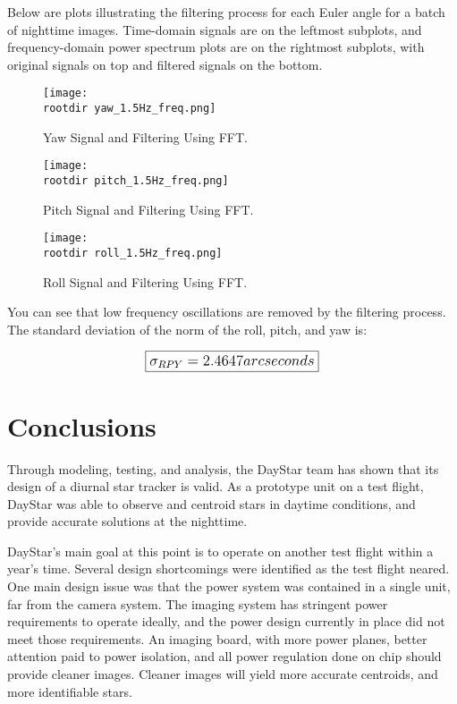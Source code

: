 \documentclass[twocolumn,letterpaper]{IEEEAerospace2012}
\newcommand{\rootdir}{./Figures/}
\begin{document}
Below are plots illustrating the filtering process for each Euler angle for a batch of nighttime images. Time-domain signals are on the leftmost subplots, and frequency-domain power spectrum plots are on the rightmost subplots, with original signals on top and filtered signals on the bottom.

\begin{figure}
    \texttt{[image: \\rootdir yaw\_1.5Hz\_freq.png]}
    \caption{Yaw Signal and Filtering Using FFT.}
    \label{fig:Yaw Filtering}
\end{figure}

\begin{figure}
    \texttt{[image: \\rootdir pitch\_1.5Hz\_freq.png]}
    \caption{Pitch Signal and Filtering Using FFT.}
    \label{fig:Pitch Filtering}
\end{figure}

\begin{figure}
    \texttt{[image: \\rootdir roll\_1.5Hz\_freq.png]}
    \caption{Roll Signal and Filtering Using FFT.}
    \label{fig:Roll Filtering}
\end{figure}

You can see that low frequency oscillations are removed by the filtering process. The standard deviation of the norm of the roll, pitch, and yaw is:

\begin{displaymath}\large
    \boxed{\sigma_{RPY} = 2.4647 arcseconds}
\end{displaymath}

\section{Conclusions}
Through modeling, testing, and analysis, the DayStar team has shown that its design of a diurnal star tracker is valid. As a prototype unit on a test flight, DayStar was able to observe and centroid stars in daytime conditions, and provide accurate solutions at the nighttime.

DayStar's main goal at this point is to operate on another test flight within a year's time. Several design shortcomings were identified as the test flight neared. One main design issue was that the power system was contained in a single unit, far from the camera system. The imaging system has stringent power requirements to operate ideally, and the power design currently in place did not meet those requirements. An imaging board, with more power planes, better attention paid to power isolation, and all power regulation done on chip should provide cleaner images. Cleaner images will yield more accurate centroids, and more identifiable stars.
\end{document}
